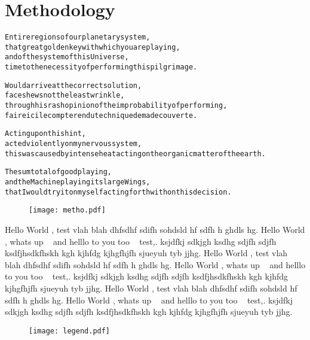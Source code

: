 
\chapter{Methodology}
\label{ch:methodology}

\startcontents[chapters]

\vfill

\begin{alltt}\sffamily
Entire regions of our planetary system,
that great golden key with which you are playing,
and of the system of this Universe,
time to the necessity of performing this pilgrimage.
 
Would arrive at the correct solution,
face shews not the least wrinkle,
through his rash opinion of the improbability of performing,
faire ici le compte rendu technique de ma decouverte.

Acting upon this hint,
acted violently on my nervous system,
this was caused by intense heat acting on the organic matter of the earth.

The sum total of good playing,
and the Machine playing its large Wings,
that I would try it on myself acting forthwith on this decision.
\end{alltt}

\newpage
\begin{figure}[!htbp]
\centering
  \texttt{[image: metho.pdf]}
\end{figure}

\vfill

{\sffamily 
Hello World \intro, test vlah blah dhfsdhf sdifh sohdsld hf sdfh h ghdls hg. Hello World \intro, whats up \inspi~ and helllo to you too \appa~ test,. ksjdfkj sdkjgh  ksdhg sdjfh sdjfh ksdfjhsdkfhskh kgh kjhfdg kjhgfhjfh sjueyuh tyb jjhg.
Hello World \intro, test vlah blah dhfsdhf sdifh sohdsld hf sdfh h ghdls hg. Hello World \intro, whats up \inspi~ and helllo to you too \appa~ test,. ksjdfkj sdkjgh  ksdhg sdjfh sdjfh ksdfjhsdkfhskh kgh kjhfdg kjhgfhjfh sjueyuh tyb jjhg.
Hello World \intro, test vlah blah dhfsdhf sdifh sohdsld hf sdfh h ghdls hg. Hello World \intro, whats up \inspi~ and helllo to you too \appa~ test,. ksjdfkj sdkjgh  ksdhg sdjfh sdjfh ksdfjhsdkfhskh kgh kjhfdg kjhgfhjfh sjueyuh tyb jjhg.
}

\begin{figure}[!htbp]
\centering
  \texttt{[image: legend.pdf]}
\end{figure}

\newpage
\minicontents
\spirals

